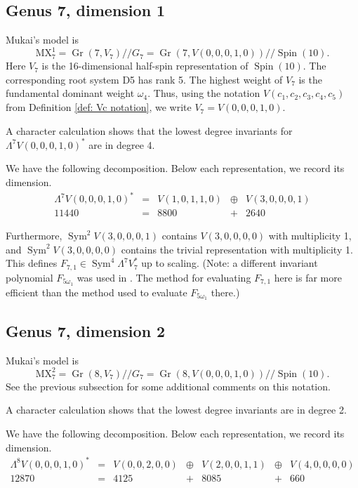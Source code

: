 \documentclass{amsart}[12pt]
\theoremstyle{definition}
\numberwithin{equation}{section}
\newcommand{\Sym}{\operatorname{Sym}}
\newcommand{\Spin}{\operatorname{Spin}}
\newcommand{\Gr}{\operatorname{Gr}}
\newcommand{\git}{/\!\!/}
\newcommand{\mywedge}{\mathsf{\Lambda}}
\newcommand{\mukai}{\mathrm{MX}}
\newcommand{\LieG}{G}
\begin{document}
\subsection{Genus 7, dimension 1}
Mukai's model is
\[
\mukai^{1}_7 =  \Gr(7,V_7) \git \LieG_7 = \Gr(7,V(0,0,0,1,0)) \git \Spin(10).
\]
Here $V_7$ is the 16-dimensional half-spin representation of
$\Spin(10)$. The corresponding root system D5 has rank 5. The highest
weight of $V_7$ is the fundamental dominant weight
$\omega_4$. Thus, using the notation $V(c_1,c_2,c_3,c_4,c_5)$ from
Definition \ref{def: Vc notation}, we write $V_7 = V(0,0,0,1,0)$.  

A character calculation shows that the lowest degree invariants for $\mywedge^7 V(0,0,0,1,0)^{*} $ are in
degree 4.

We have the following decomposition. Below each representation, we
record its dimension.
\[
\begin{array}{ccccc}
  \mywedge^7 V(0,0,0,1,0)^{*} & = & V(1,0,1,1,0) & \oplus & V(3,0,0,0,1)
  \\
  11440 & = & 8800 &+ & 2640 
\end{array}
\]



Furthermore, $\Sym^2 V(3,0,0,0,1)$ contains $V(3,0,0,0,0)$ with
multiplicity 1, and $\Sym^2 V(3,0,0,0,0)$ contains the trivial representation with
multiplicity 1. This defines $F_{7,1} \in
\Sym^4 \mywedge^7 V_7^{*}$ up to scaling. (Note: a different invariant
polynomial $F_{5\omega_1}$ was used in \cite{Swinarski2025}. The method for evaluating
$F_{7,1}$ here is far more efficient than the method used to
evaluate $F_{5 \omega_1}$ there.)


\subsection{Genus 7, dimension 2}
Mukai's model is
\[
\mukai^{2}_7 =  \Gr(8,V_7) \git \LieG_7 = \Gr(8,V(0,0,0,1,0)) \git \Spin(10).
\]
See the previous subsection for some additional comments on this
notation.

A character calculation shows that the lowest degree invariants are in
degree 2.

We have the following decomposition. Below each representation, we
record its dimension.
\[
\begin{array}{ccccccc}
  \mywedge^8 V(0,0,0,1,0)^{*} & = & V(0,0,2,0,0) & \oplus & V(2,0,0,1,1) & \oplus &V(4,0,0,0,0)
  \\
  12870 & = & 4125&+ & 8085 & + & 660
\end{array}
\]
\end{document}
